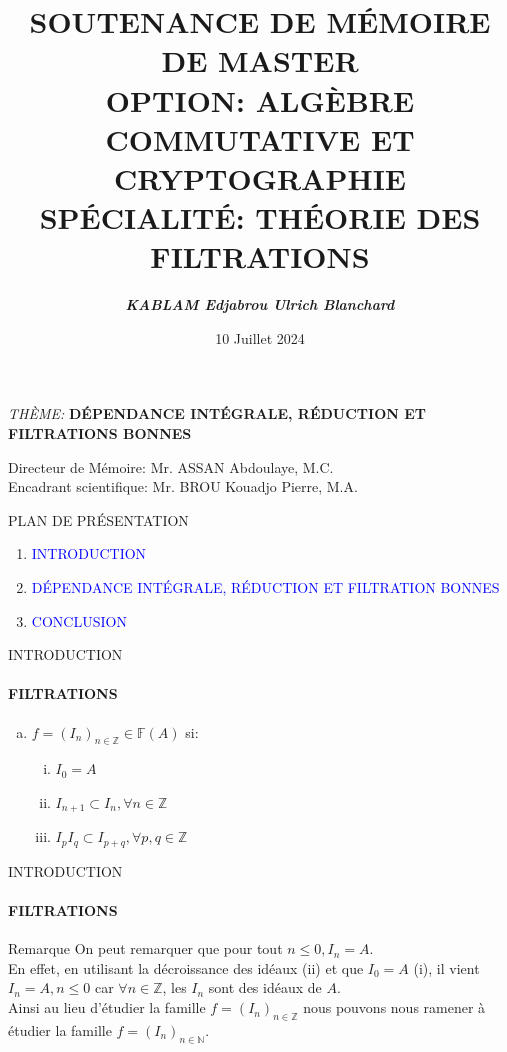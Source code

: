 \documentclass[11pt,a4paper]{beamer}
\author{\textit{\textbf{KABLAM Edjabrou Ulrich Blanchard}}}
\title{\textbf{SOUTENANCE DE MÉMOIRE DE MASTER \\ OPTION: ALGÈBRE COMMUTATIVE ET CRYPTOGRAPHIE\\ SPÉCIALITÉ: THÉORIE DES FILTRATIONS}}
\institute{\textcolor{red}{\textbf{Université NANGUI ABROGOUA \\ UFR Sciences Fondamentales Appliquées}}}
\date{10 Juillet 2024}
\begin{document}
	\begin{frame}
		\maketitle
		\begin{block}{\begin{center}
					\emph{THÈME:} \textbf{DÉPENDANCE INTÉGRALE, RÉDUCTION ET FILTRATIONS BONNES }
			\end{center}}
			\begin{center}
				Directeur de Mémoire: Mr. ASSAN Abdoulaye, M.C. \\
				Encadrant scientifique: Mr. BROU Kouadjo Pierre, M.A.
			\end{center}
		\end{block}
	\end{frame}
	
	\begin{frame}{
			PLAN DE PRÉSENTATION}
		\begin{enumerate}
			\item \textcolor{blue}{INTRODUCTION}\\
			\item \textcolor{blue}{DÉPENDANCE INTÉGRALE, RÉDUCTION ET FILTRATION BONNES }\\
			\item \textcolor{blue}{CONCLUSION}\\
		\end{enumerate}
	\end{frame}
	\setbeamercovered{transparent}
	
	\begin{frame}{INTRODUCTION}
		\framesubtitle{FILTRATIONS}
		\begin{block}{}
			\begin{enumerate}[(a)]
				\item $f=(I_n)_{n \in \mathbb{Z}} \in \mathbb{F}(A)$ si: 
				\begin{enumerate}[(i)]
					\item $I_0 = A$
					\item $I_{n+1} \subset I_n, \forall n \in \mathbb{Z}$
					\item $I_{p}I_{q} \subset I_{p+q}, \forall p,q \in \mathbb{Z}$
				\end{enumerate}
			\end{enumerate}
		\end{block}
	\end{frame}
	
		\begin{frame}{INTRODUCTION}
		\framesubtitle{FILTRATIONS}
		\begin{alertblock}{Remarque}
		On peut remarquer que pour tout $n\leq 0, I_n = A$.\\ En effet, en utilisant la décroissance des idéaux (ii) et que $I_0 = A$ (i), il vient $I_n = A, n \leq 0$ car $\forall n \in \mathbb{Z}$, les $I_n$ sont des idéaux de $A$.\\		
		Ainsi au lieu d'étudier la famille $f = (I_n)_{n \in \mathbb{Z}}$ nous pouvons nous ramener à étudier la famille $f = (I_n)_{n \in \mathbb{N}}$.
		\end{alertblock}
	\end{frame}
	
\end{document}
